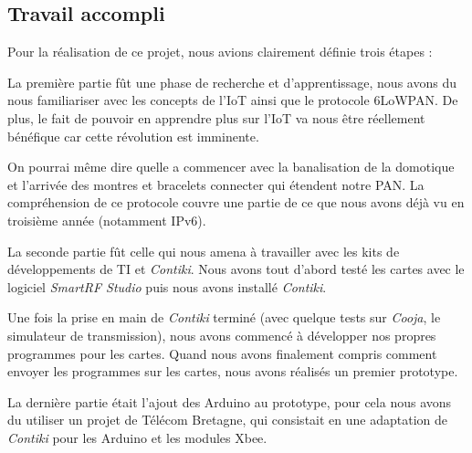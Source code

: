 
\subsection{Travail accompli}

Pour la réalisation de ce projet, nous avions clairement définie trois étapes :

La première partie fût une phase de recherche et d'apprentissage, nous avons du nous familiariser avec les concepts de l'IoT ainsi que le protocole 6LoWPAN.
De plus, le fait de pouvoir en apprendre plus sur l'IoT va nous être réellement bénéfique car cette révolution est imminente.

On pourrai même dire quelle a commencer avec la banalisation de la domotique et l'arrivée des montres et bracelets connecter qui étendent notre PAN.
La compréhension de ce protocole couvre une partie de ce que nous avons déjà vu en troisième année (notamment IPv6).

La seconde partie fût celle qui nous amena à travailler avec les kits de développements de TI et \textit{Contiki}. Nous avons tout d'abord testé les cartes avec le logiciel \textit{SmartRF Studio} puis nous avons installé \textit{Contiki}.

Une fois la prise en main de \textit{Contiki} terminé (avec quelque tests sur \textit{Cooja}, le simulateur de transmission), nous avons commencé à développer nos propres programmes pour les cartes. Quand nous avons finalement compris comment envoyer les programmes sur les cartes, nous avons réalisés un premier prototype.

La dernière partie était l'ajout des Arduino au prototype, pour cela nous avons du utiliser un projet de Télécom Bretagne, qui consistait en une adaptation de \textit{Contiki} pour les Arduino et les modules Xbee.
